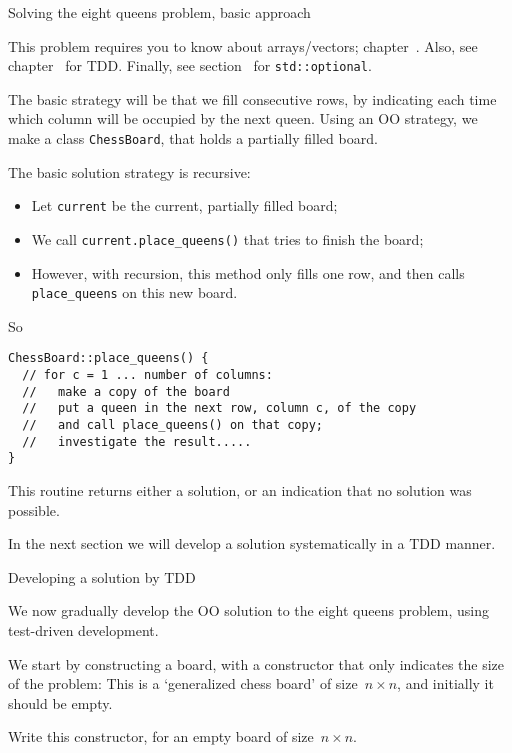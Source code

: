  {Solving the eight queens problem, basic approach}
\label{sec:8queens-strategy}

This problem requires you to know about arrays/vectors;
chapter~.
Also, see chapter~ for \ac{TDD}.
Finally, see section~ for \lstinline+std::optional+.

The basic strategy will be that we fill consecutive rows,
by indicating each time which column will be occupied by the next queen.
Using an \ac{OO} strategy, we make a class \lstinline{ChessBoard},
that holds a partially filled board.

The basic solution strategy is recursive:
\begin{itemize}
\item Let \lstinline{current} be the current, partially filled board;
\item We call \lstinline{current.place_queens()} that tries to finish the board;
\item However, with recursion, this method only fills one row,
  and then calls \lstinline+place_queens+ on this new board.
\end{itemize}
So
\begin{lstlisting}
ChessBoard::place_queens() {
  // for c = 1 ... number of columns:
  //   make a copy of the board
  //   put a queen in the next row, column c, of the copy
  //   and call place_queens() on that copy;
  //   investigate the result.....
}
\end{lstlisting}
This routine returns either a solution, or an indication that no solution was possible.

In the next section we will develop a solution
systematically in a \ac{TDD} manner.

 {Developing a solution by TDD}
\label{sec:8queens-tdd}

We now gradually develop the \ac{OO} solution to the eight queens problem,
using test-driven development.


We start by constructing a board,
with a constructor that only indicates the size of the problem:
This is a `generalized chess board' of size~$n\times n$,
and initially it should be empty.

\begin{exercise}
  Write this constructor, for an empty board of size~$n\times n$.
\end{exercise}

